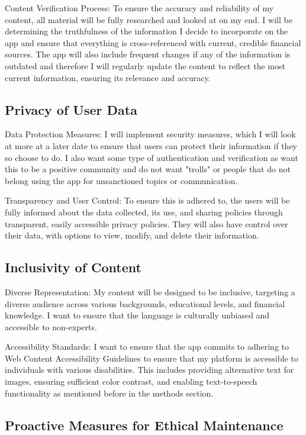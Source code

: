 \documentclass[12pt,twocolumn]{article}
\begin{document}
Content Verification Process: To ensure the accuracy and reliability of my content, all material will be fully researched and looked at on my end. I will be determining the truthfulness of the information I decide to incorporate on the app and ensure that everything is cross-referenced with current, credible financial sources. The app will also include frequent changes if any of the information is outdated and therefore I  will regularly update the content to reflect the most current information, ensuring its relevance and accuracy.

\subsection{Privacy of User Data}

Data Protection Measures: I will implement security measures, which I will look at more at a later date to ensure that users can protect their information if they so choose to do. I also want some type of authentication and verification as  want this to be a positive community and do not want "trolls" or people that do not belong using the app for unsanctioned topics or communication. 

Transparency and User Control: To ensure this is adhered to, the users will be fully informed about the data collected, its use, and sharing policies through transparent, easily accessible privacy policies. They will also have control over their data, with options to view, modify, and delete their information.

\subsection{Inclusivity of Content}

Diverse Representation: My content will be designed to be inclusive, targeting a diverse audience across various backgrounds, educational levels, and financial knowledge. I want to  ensure that the language is culturally unbiased and accessible to non-experts.

Accessibility Standards: I want to ensure that the app commits to adhering to Web Content Accessibility Guidelines to ensure that my platform is accessible to individuals with various disabilities. This includes providing alternative text for images, ensuring sufficient color contrast, and enabling text-to-speech functionality as mentioned before in the methods section. 

\subsection{Proactive Measures for Ethical Maintenance}
\end{document}
